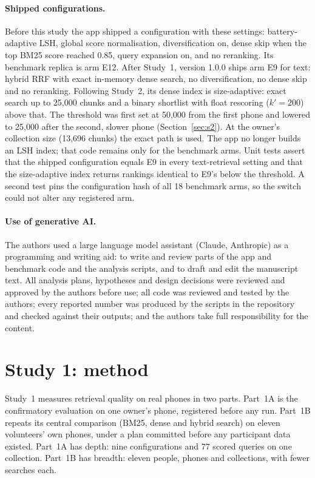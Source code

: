 \documentclass[pdflatex,sn-basic,Numbered]{sn-jnl}
\begin{document}
\paragraph{Shipped configurations.} Before this study the app shipped a configuration with these settings: battery-adaptive LSH, global score normalisation, diversification on, dense skip when the top BM25 score reached 0.85, query expansion on, and no reranking. Its benchmark replica is arm E12. After Study~1, version 1.0.0 ships arm E9 for text: hybrid RRF with exact in-memory dense search, no diversification, no dense skip and no reranking. Following Study~2, its dense index is size-adaptive: exact search up to 25,000 chunks and a binary shortlist with float rescoring ($k'=200$) above that. The threshold was first set at 50,000 from the first phone and lowered to 25,000 after the second, slower phone (Section~\ref{sec:s2}). At the owner's collection size (13,696 chunks) the exact path is used. The app no longer builds an LSH index; that code remains only for the benchmark arms. Unit tests assert that the shipped configuration equals E9 in every text-retrieval setting and that the size-adaptive index returns rankings identical to E9's below the threshold. A second test pins the configuration hash of all 18 benchmark arms, so the switch could not alter any registered arm.

\paragraph{Use of generative AI.} The authors used a large language model assistant (Claude, Anthropic) as a programming and writing aid: to write and review parts of the app and benchmark code and the analysis scripts, and to draft and edit the manuscript text. All analysis plans, hypotheses and design decisions were reviewed and approved by the authors before use; all code was reviewed and tested by the authors; every reported number was produced by the scripts in the repository and checked against their outputs; and the authors take full responsibility for the content.

\section{Study 1: method}\label{sec:s1method}

Study~1 measures retrieval quality on real phones in two parts. Part~1A is the confirmatory evaluation on one owner's phone, registered before any run. Part~1B repeats its central comparison (BM25, dense and hybrid search) on eleven volunteers' own phones, under a plan committed before any participant data existed. Part~1A has depth: nine configurations and 77 scored queries on one collection. Part~1B has breadth: eleven people, phones and collections, with fewer searches each.
\end{document}
